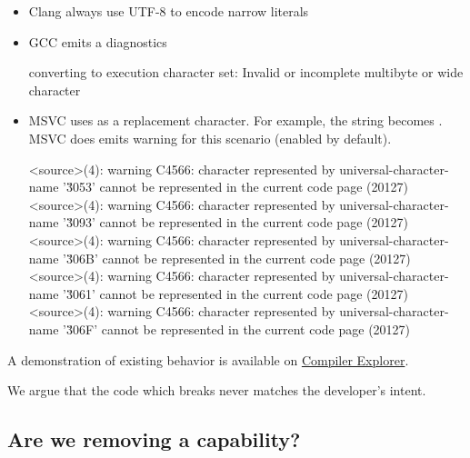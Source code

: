 \documentclass{wg21}
\begin{document}
    \begin{itemize}
        \item Clang always use UTF-8 to encode narrow literals
        \item GCC emits a diagnostics
        
        \begin{quoteblock}
            converting to execution character set: Invalid or incomplete multibyte or wide character
        \end{quoteblock}
        \item MSVC uses  as a replacement character.
        For example, the string  becomes .
        MSVC does emits warning for this scenario (enabled by default).
        
        \begin{quoteblock}
            \begin{codeblock}
                <source>(4): warning C4566: character represented by universal-character-name 
                '\u3053' cannot be represented in the current code page (20127)
                <source>(4): warning C4566: character represented by universal-character-name
                '\u3093' cannot be represented in the current code page (20127)
                <source>(4): warning C4566: character represented by universal-character-name 
                '\u306B' cannot be represented in the current code page (20127)
                <source>(4): warning C4566: character represented by universal-character-name
                '\u3061' cannot be represented in the current code page (20127)
                <source>(4): warning C4566: character represented by universal-character-name 
                '\u306F' cannot be represented in the current code page (20127)
            \end{codeblock}
        \end{quoteblock}
        
    \end{itemize}
    
    A demonstration of existing behavior is available on \href{https://compiler-explorer.com/z/4vheqx1oj}{Compiler Explorer}.
    
    We argue that the code which breaks never matches the developer's intent.
    
    \subsection{Are we removing a capability?}
    
\end{document}
